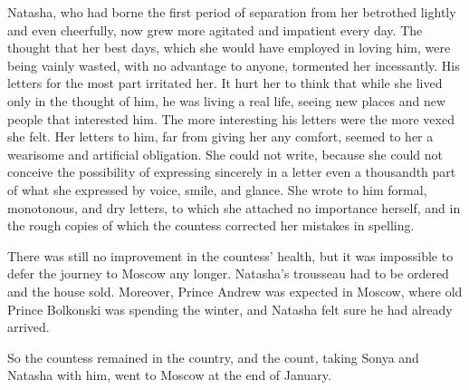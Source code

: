 Natasha, who had borne the first period of separation from her
betrothed lightly and even cheerfully, now grew more agitated and
impatient every day. The thought that her best days, which she
would have employed in loving him, were being vainly wasted, with
no advantage to anyone, tormented her incessantly. His letters
for the most part irritated her.  It hurt her to think that while
she lived only in the thought of him, he was living a real life,
seeing new places and new people that interested him. The more
interesting his letters were the more vexed she felt. Her letters
to him, far from giving her any comfort, seemed to her a
wearisome and artificial obligation. She could not write, because
she could not conceive the possibility of expressing sincerely in
a letter even a thousandth part of what she expressed by voice,
smile, and glance. She wrote to him formal, monotonous, and dry
letters, to which she attached no importance herself, and in the
rough copies of which the countess corrected her mistakes in
spelling.

There was still no improvement in the countess' health, but it
was impossible to defer the journey to Moscow any
longer. Natasha's trousseau had to be ordered and the house
sold. Moreover, Prince Andrew was expected in Moscow, where old
Prince Bolkonski was spending the winter, and Natasha felt sure
he had already arrived.

So the countess remained in the country, and the count, taking
Sonya and Natasha with him, went to Moscow at the end of January.